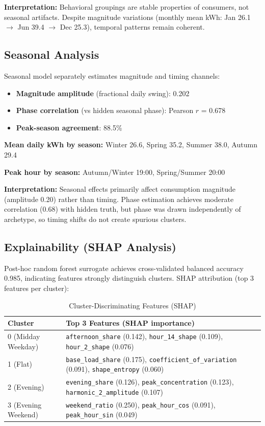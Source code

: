 \textbf{Interpretation:} Behavioral groupings are stable properties of consumers, not seasonal artifacts. Despite magnitude variations (monthly mean kWh: Jan 26.1 $\rightarrow$ Jun 39.4 $\rightarrow$ Dec 25.3), temporal patterns remain coherent.

\subsection{Seasonal Analysis}

Seasonal model separately estimates magnitude and timing channels:

\begin{itemize}
    \item \textbf{Magnitude amplitude} (fractional daily swing): 0.202
    \item \textbf{Phase correlation} (vs hidden seasonal phase): Pearson $r$ = 0.678
    \item \textbf{Peak-season agreement}: 88.5\%
\end{itemize}

\textbf{Mean daily kWh by season:} Winter 26.6, Spring 35.2, Summer 38.0, Autumn 29.4

\textbf{Peak hour by season:} Autumn/Winter 19:00, Spring/Summer 20:00

\textbf{Interpretation:} Seasonal effects primarily affect consumption magnitude (amplitude 0.20) rather than timing. Phase estimation achieves moderate correlation (0.68) with hidden truth, but phase was drawn independently of archetype, so timing shifts do not create spurious clusters.

\subsection{Explainability (SHAP Analysis)}

Post-hoc random forest surrogate achieves cross-validated balanced accuracy 0.985, indicating features strongly distinguish clusters. SHAP attribution (top 3 features per cluster):

\begin{table}[h]
\centering
\small
\caption{Cluster-Discriminating Features (SHAP)}
\label{tab:shap_features}
\begin{tabular}{@{}lp{8cm}@{}}
\toprule
Cluster & Top 3 Features (SHAP importance) \\
\midrule
0 (Midday Weekday) & \texttt{afternoon\_share} (0.142), \texttt{hour\_14\_shape} (0.109), \texttt{hour\_2\_shape} (0.076) \\
1 (Flat) & \texttt{base\_load\_share} (0.175), \texttt{coefficient\_of\_variation} (0.091), \texttt{shape\_entropy} (0.060) \\
2 (Evening) & \texttt{evening\_share} (0.126), \texttt{peak\_concentration} (0.123), \texttt{harmonic\_2\_amplitude} (0.107) \\
3 (Evening Weekend) & \texttt{weekend\_ratio} (0.250), \texttt{peak\_hour\_cos} (0.091), \texttt{peak\_hour\_sin} (0.049) \\
\bottomrule
\end{tabular}
\end{table}

